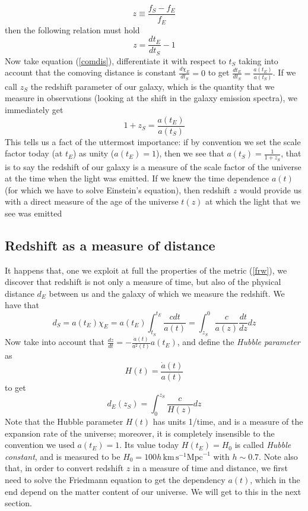 \begin{equation}
z\equiv \frac{f_S-f_E}{f_E}
\end{equation}
then the following relation must hold
\begin{equation}
z=\frac{dt_E}{dt_S}-1
\end{equation}
Now take equation (\ref{comdis}), differentiate it with respect to $t_S$ taking into account that the comoving distance is constant $\frac{d\chi_E}{dt_S}=0$ to get $\frac{dt_E}{dt_S}=\frac{a(t_E)}{a(t_S)}$. If we call $z_S$ the redshift parameter of our galaxy, which is the quantity that we measure in observations (looking at the shift in the galaxy emission spectra), we immediately get
\begin{equation}
1+z_S=\frac{a(t_E)}{a(t_S)}
\end{equation}
This tells us a fact of the uttermost importance: if by convention we set the scale factor today (at $t_E$) as unity ($a(t_E)=1$), then we see that $a(t_S)=\frac{1}{1+z_S}$, that is to say the redshift of our galaxy is a measure of the scale factor of the universe at the time when the light was emitted. If we knew the time dependence $a(t)$ (for which we have to solve Einstein's equation), then redshift $z$ would provide us with a direct measure of the age of the universe $t(z)$ at which the light that we see was emitted
\subsection{Redshift as a measure of distance}
It happens that, one we exploit at full the properties of the metric (\ref{frw}), we discover that redshift is not only a measure of time, but also of the physical distance $d_E$ between us and the galaxy of which we measure the redshift. We have that
\begin{equation}
d_S=a(t_E)\chi_E=a(t_E)\int_{t_S}^{t_E}\frac{cdt}{a(t)}=\int_{z_S}^0\frac{c}{a(z)}\frac{dt}{dz}dz
\end{equation}
Now take into account that $\frac{dz}{dt}=-\frac{\dot{a}(t)}{a^2(t)}a(t_E)$, and define the \textit{Hubble parameter} as 
\begin{equation}
H(t)=\frac{\dot{a}(t)}{a(t)}
\end{equation}
to get
\begin{equation}
\label{distanceredshift}
d_E(z_S)=\int_0^{z_S}\frac{c}{H(z)}dz
\end{equation}
Note that the Hubble parameter $H(t)$ has units 1/time, and is a measure of the expansion rate of the universe; moreover, it is completely insensible to the convention we used $a(t_E)=1$. Its value today $H(t_E)=H_0$ is called \textit{Hubble constant}, and is measured to be $H_0=100h\,\mathrm{km}\,\mathrm{s}^{-1}\mathrm{Mpc}^{-1}$ with $h\sim 0.7$. Note also that, in order to convert redshift $z$ in a measure of time and distance, we first need to solve the Friedmann equation to get the dependency $a(t)$, which in the end depend on the matter content of our universe. We will get to this in the next section. 

